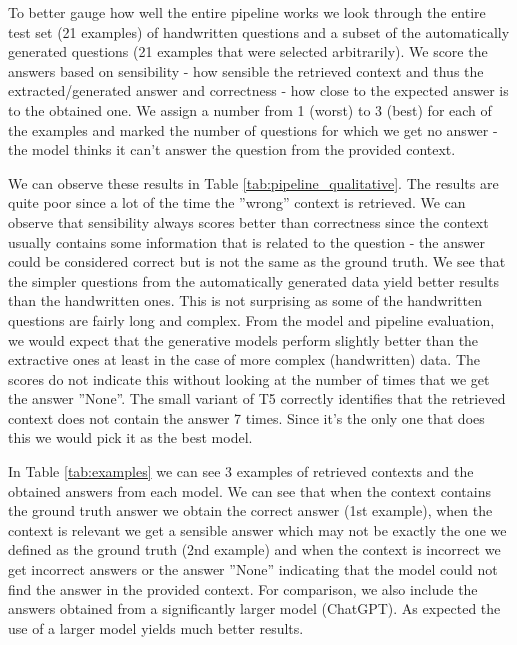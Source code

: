 \documentclass[fleqn,moreauthors,10pt]{ds_report}
\begin{document}
\noindent To better gauge how well the entire pipeline works we look through the entire test set (21 examples) of handwritten questions and a subset of the automatically generated questions (21 examples that were selected arbitrarily).
We score the answers based on sensibility - how sensible the retrieved context and thus the extracted/generated answer and correctness - how close to the expected answer is to the obtained one.
We assign a number from 1 (worst) to 3 (best) for each of the examples and marked the number of questions for which we get no answer - the model thinks it can't answer the question from the provided context.

\noindent We can observe these results in Table \ref{tab:pipeline_qualitative}.
The results are quite poor since a lot of the time the ''wrong'' context is retrieved.
We can observe that sensibility always scores better than correctness since the context usually contains some information that is related to the question - the answer could be considered correct but is not the same as the ground truth.
We see that the simpler questions from the automatically generated data yield better results than the handwritten ones.
This is not surprising as some of the handwritten questions are fairly long and complex.
From the model and pipeline evaluation, we would expect that the generative models perform slightly better than the extractive ones at least in the case of more complex (handwritten) data.
The scores do not indicate this without looking at the number of times that we get the answer ''None''.
The small variant of T5 correctly identifies that the retrieved context does not contain the answer 7 times. Since it's the only one that does this we would pick it as the best model.

\noindent In Table \ref{tab:examples} we can see 3 examples of retrieved contexts and the obtained answers from each model.
We can see that when the context contains the ground truth answer we obtain the correct answer (1st example), when the context is relevant we get a sensible answer which may not be exactly the one we defined as the ground truth (2nd example) and when the context is incorrect we get incorrect answers or the answer ''None'' indicating that the model could not find the answer in the provided context.
For comparison, we also include the answers obtained from a significantly larger model (ChatGPT). As expected the use of a larger model yields much better results.

\end{document}
